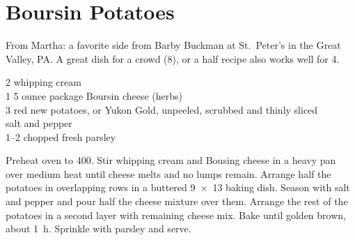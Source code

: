 \section{Boursin Potatoes}

\begin{open}
    From Martha: a favorite side from Barby Buckman at St.~Peter's in the Great
    Valley, PA. A great dish for a crowd (8), or a half recipe also works well
    for 4.
\end{open}
\begin{ingredients}
    \SI{2}{\cup} whipping cream\\
    1 \SI{5}{\ounce} ounce package Boursin cheese (herbs)\\
    \SI{3}{\pound} red new potatoes, or Yukon Gold, unpeeled, scrubbed and
    thinly sliced\\
    salt and pepper\\
    \SIrange{1}{2}{\tblspoon} chopped fresh parsley\\
\end{ingredients}
Preheat oven to \SI{400}{\degreeF}. Stir whipping cream and Bousing cheese in a
heavy pan over medium heat until cheese melts and no lumps remain. Arrange half
the potatoes in overlapping rows in a buttered \SI{9x13}{\inch} baking dish.
Season with salt and pepper and pour half the cheese mixture over them. Arrange
the rest of the potatoes in a second layer with remaining cheese mix. Bake until
golden brown, about \SI{1}{\hour}. Sprinkle with parsley and serve.